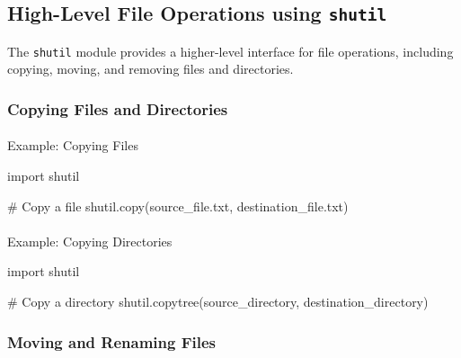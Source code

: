 \documentclass[
  letterpaper,
  DIV=11,
  numbers=noendperiod]{scrreprt}
\makeatletter
\let\oldparagraph\paragraph
\renewcommand{\paragraph}{
    \@ifstar
      \xxxParagraphStar
      \xxxParagraphNoStar
  }
\newcommand{\xxxParagraphStar}[1]{\oldparagraph*{#1}\mbox{}}
\newcommand{\xxxParagraphNoStar}[1]{\oldparagraph{#1}\mbox{}}
\newenvironment{Shaded}{\begin{snugshade}}{\end{snugshade}}
\newcommand{\CommentTok}[1]{\textcolor[rgb]{0.37,0.37,0.37}{#1}}
\newcommand{\ImportTok}[1]{\textcolor[rgb]{0.00,0.46,0.62}{#1}}
\newcommand{\NormalTok}[1]{\textcolor[rgb]{0.00,0.23,0.31}{#1}}
\newcommand{\StringTok}[1]{\textcolor[rgb]{0.13,0.47,0.30}{#1}}
\makeatother
\begin{document}
\subsection{\texorpdfstring{High-Level File Operations using
\texttt{shutil}}{High-Level File Operations using shutil}}\label{high-level-file-operations-using-shutil}

The \texttt{shutil} module provides a higher-level interface for file
operations, including copying, moving, and removing files and
directories.

\subsubsection{Copying Files and
Directories}\label{copying-files-and-directories}

\paragraph{Example: Copying Files}\label{example-copying-files}

\begin{Shaded}
\begin{Highlighting}[]
\ImportTok{import}\NormalTok{ shutil}

\CommentTok{\# Copy a file}
\NormalTok{shutil.copy(}\StringTok{\textquotesingle{}source\_file.txt\textquotesingle{}}\NormalTok{, }\StringTok{\textquotesingle{}destination\_file.txt\textquotesingle{}}\NormalTok{)}
\end{Highlighting}
\end{Shaded}

\paragraph{Example: Copying
Directories}\label{example-copying-directories}

\begin{Shaded}
\begin{Highlighting}[]
\ImportTok{import}\NormalTok{ shutil}

\CommentTok{\# Copy a directory}
\NormalTok{shutil.copytree(}\StringTok{\textquotesingle{}source\_directory\textquotesingle{}}\NormalTok{, }\StringTok{\textquotesingle{}destination\_directory\textquotesingle{}}\NormalTok{)}
\end{Highlighting}
\end{Shaded}

\subsubsection{Moving and Renaming
Files}\label{moving-and-renaming-files}
\end{document}

